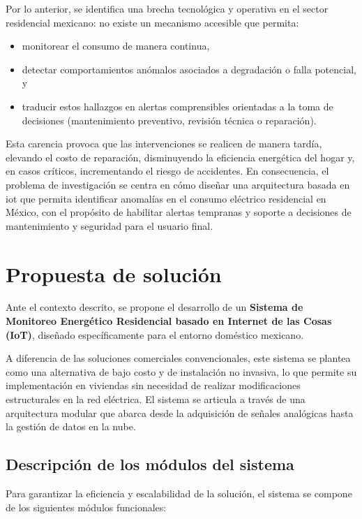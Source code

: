 ﻿\documentclass[12pt,openright,oneside]{report}
\theoremstyle{mytheoremstyle}
\theoremstyle{mytheoremstyle}
\theoremstyle{myproblemstyle}
\begin{document}
Por lo anterior, se identifica una brecha tecnológica y operativa en el sector residencial mexicano: no existe un mecanismo accesible que permita:
\begin{itemize}
    \item monitorear el consumo de manera continua,
    \item detectar comportamientos anómalos asociados a degradación o falla potencial, y
    \item traducir estos hallazgos en alertas comprensibles orientadas a la toma de decisiones (mantenimiento preventivo, revisión técnica o reparación).
\end{itemize}
Esta carencia provoca que las intervenciones se realicen de manera tardía, elevando el costo de reparación, disminuyendo la eficiencia energética del hogar y, en casos críticos, incrementando el riesgo de accidentes. En consecuencia, el problema de investigación se centra en cómo diseñar una arquitectura basada en \gls{iot} que permita identificar anomalías en el consumo eléctrico residencial en México, con el propósito de habilitar alertas tempranas y soporte a decisiones de mantenimiento y seguridad para el usuario final.
\section{Propuesta de solución}
\label{sec:propuesta-solucion}

Ante el contexto descrito, se propone el desarrollo de un \textbf{Sistema de Monitoreo Energético Residencial basado en Internet de las Cosas (IoT)}, diseñado específicamente para el entorno doméstico mexicano.

A diferencia de las soluciones comerciales convencionales, este sistema se plantea como una alternativa de bajo costo y de instalación no invasiva, lo que permite su implementación en viviendas sin necesidad de realizar modificaciones estructurales en la red eléctrica. El sistema se articula a través de una arquitectura modular que abarca desde la adquisición de señales analógicas hasta la gestión de datos en la nube.

\subsection{Descripción de los módulos del sistema}

Para garantizar la eficiencia y escalabilidad de la solución, el sistema se compone de los siguientes módulos funcionales:
\end{document}
